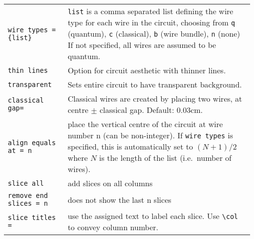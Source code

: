 \documentclass[aps,pra,10pt,nofootinbib]{revtex4-2}
\begin{document}
\begin{description}[style=nextline]
        \begin{tabular}{p{4cm}p{10cm}}
          \texttt{wire types = \{list\}} & \texttt{list} is a comma separated list defining the wire type for each wire in the circuit, choosing from \texttt{q} (quantum), \texttt{c} (classical), \texttt{b} (wire bundle), \texttt{n} (none) If not specified, all wires are assumed to be quantum. \\
          \texttt{thin lines}            & Option for circuit aesthetic with thinner lines.                                                                                                                                                                                                            \\
          \texttt{transparent}           & Sets entire circuit to have transparent background.                                                                                                                                                                                                         \\
          \texttt{classical gap=}        & Classical wires are created by placing two wires, at centre $\pm$ classical gap. Default: 0.03cm.                                                                                                                                                           \\
          \texttt{align equals at = n}   & place the vertical centre of the circuit at wire number n (can be non-integer). If \verb!wire types! is specified, this is automatically set to $(N+1)/2$ where $N$ is the length of the list (i.e.\ number of wires).                                      \\
          \texttt{slice all}             & add slices on all columns                                                                                                                                                                                                                                   \\
          \texttt{remove end slices = n} & does not show the last n slices                                                                                                                                                                                                                             \\
          \texttt{slice titles =}        & use the assigned text to label each slice. Use \verb!\col! to convey column number.                                                                                                                                                                         \\

\end{tabular}
\end{description}
\end{document}
